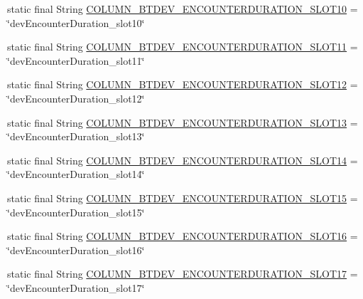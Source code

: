 \begin{DoxyCompactItemize}
\item 
static final String \hyperlink{classcom_1_1social_1_1proximity_1_1_s_q_lite_helper_a5ba0cd9a977e655f9d6989b39d0aa8b4}{C\+O\+L\+U\+M\+N\+\_\+\+B\+T\+D\+E\+V\+\_\+\+E\+N\+C\+O\+U\+N\+T\+E\+R\+D\+U\+R\+A\+T\+I\+O\+N\+\_\+\+S\+L\+O\+T10} = \char`\"{}dev\+Encounter\+Duration\+\_\+slot10\char`\"{}
\item 
static final String \hyperlink{classcom_1_1social_1_1proximity_1_1_s_q_lite_helper_a3ce051a1a793dab86096dc134f868209}{C\+O\+L\+U\+M\+N\+\_\+\+B\+T\+D\+E\+V\+\_\+\+E\+N\+C\+O\+U\+N\+T\+E\+R\+D\+U\+R\+A\+T\+I\+O\+N\+\_\+\+S\+L\+O\+T11} = \char`\"{}dev\+Encounter\+Duration\+\_\+slot11\char`\"{}
\item 
static final String \hyperlink{classcom_1_1social_1_1proximity_1_1_s_q_lite_helper_a246ee25c1f15c42957c92bfa5ee09c7c}{C\+O\+L\+U\+M\+N\+\_\+\+B\+T\+D\+E\+V\+\_\+\+E\+N\+C\+O\+U\+N\+T\+E\+R\+D\+U\+R\+A\+T\+I\+O\+N\+\_\+\+S\+L\+O\+T12} = \char`\"{}dev\+Encounter\+Duration\+\_\+slot12\char`\"{}
\item 
static final String \hyperlink{classcom_1_1social_1_1proximity_1_1_s_q_lite_helper_a9480c974d7f0ef4045ca4c34d9af46b6}{C\+O\+L\+U\+M\+N\+\_\+\+B\+T\+D\+E\+V\+\_\+\+E\+N\+C\+O\+U\+N\+T\+E\+R\+D\+U\+R\+A\+T\+I\+O\+N\+\_\+\+S\+L\+O\+T13} = \char`\"{}dev\+Encounter\+Duration\+\_\+slot13\char`\"{}
\item 
static final String \hyperlink{classcom_1_1social_1_1proximity_1_1_s_q_lite_helper_a1dcbfded30adb9b942ba4e81400ee4cf}{C\+O\+L\+U\+M\+N\+\_\+\+B\+T\+D\+E\+V\+\_\+\+E\+N\+C\+O\+U\+N\+T\+E\+R\+D\+U\+R\+A\+T\+I\+O\+N\+\_\+\+S\+L\+O\+T14} = \char`\"{}dev\+Encounter\+Duration\+\_\+slot14\char`\"{}
\item 
static final String \hyperlink{classcom_1_1social_1_1proximity_1_1_s_q_lite_helper_a20ffddb39e9b7a0de16c22e97a1fe59e}{C\+O\+L\+U\+M\+N\+\_\+\+B\+T\+D\+E\+V\+\_\+\+E\+N\+C\+O\+U\+N\+T\+E\+R\+D\+U\+R\+A\+T\+I\+O\+N\+\_\+\+S\+L\+O\+T15} = \char`\"{}dev\+Encounter\+Duration\+\_\+slot15\char`\"{}
\item 
static final String \hyperlink{classcom_1_1social_1_1proximity_1_1_s_q_lite_helper_a17332b2dcfbf24bac890a6938b985e07}{C\+O\+L\+U\+M\+N\+\_\+\+B\+T\+D\+E\+V\+\_\+\+E\+N\+C\+O\+U\+N\+T\+E\+R\+D\+U\+R\+A\+T\+I\+O\+N\+\_\+\+S\+L\+O\+T16} = \char`\"{}dev\+Encounter\+Duration\+\_\+slot16\char`\"{}
\item 
static final String \hyperlink{classcom_1_1social_1_1proximity_1_1_s_q_lite_helper_ad89f48a90c002e224b42a61c53a1646c}{C\+O\+L\+U\+M\+N\+\_\+\+B\+T\+D\+E\+V\+\_\+\+E\+N\+C\+O\+U\+N\+T\+E\+R\+D\+U\+R\+A\+T\+I\+O\+N\+\_\+\+S\+L\+O\+T17} = \char`\"{}dev\+Encounter\+Duration\+\_\+slot17\char`\"{}

\end{DoxyCompactItemize}
